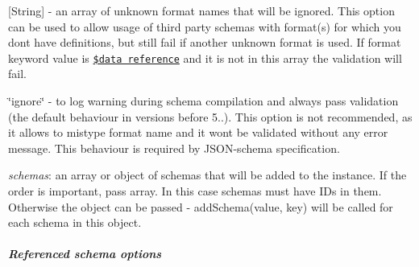 \begin{DoxyItemize}
\begin{DoxyItemize}
\item {\ttfamily \mbox{[}String\mbox{]}} -\/ an array of unknown format names that will be ignored. This option can be used to allow usage of third party schemas with format(s) for which you don\textquotesingle{}t have definitions, but still fail if another unknown format is used. If {\ttfamily format} keyword value is \href{#data-reference}{\tt \$data reference} and it is not in this array the validation will fail.
\item {\ttfamily \char`\"{}ignore\char`\"{}} -\/ to log warning during schema compilation and always pass validation (the default behaviour in versions before 5..). This option is not recommended, as it allows to mistype format name and it won\textquotesingle{}t be validated without any error message. This behaviour is required by J\+S\+O\+N-\/schema specification.
\end{DoxyItemize}
\item {\itshape schemas}\+: an array or object of schemas that will be added to the instance. If the order is important, pass array. In this case schemas must have I\+Ds in them. Otherwise the object can be passed -\/ {\ttfamily add\+Schema(value, key)} will be called for each schema in this object.
\end{DoxyItemize}

\subparagraph*{Referenced schema options}


